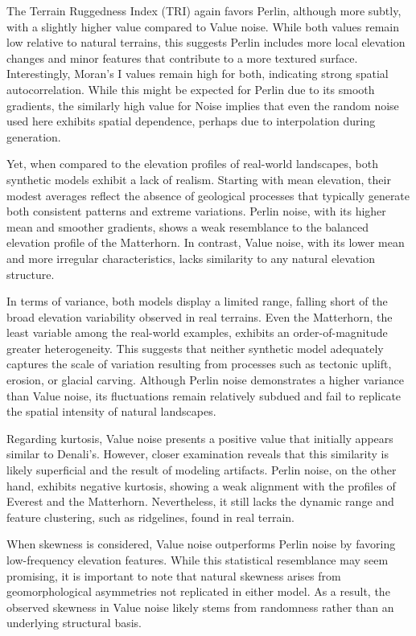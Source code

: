 The Terrain Ruggedness Index (TRI) again favors Perlin, although more subtly, with a slightly higher value compared to Value noise. While both values remain low relative to natural terrains, this 
suggests Perlin includes more local elevation changes and minor features that contribute to a more textured surface. Interestingly, Moran’s I values remain high for both, indicating strong spatial 
autocorrelation. While this might be expected for Perlin due to its smooth gradients, the similarly high value for Noise implies that even the random noise used here exhibits spatial dependence, 
perhaps due to interpolation during generation.

Yet, when compared to the elevation profiles of real-world landscapes, both synthetic models exhibit a lack of realism. Starting with mean elevation, their modest averages reflect the absence of 
geological processes that typically generate both consistent patterns and extreme variations. Perlin noise, with its higher mean and smoother gradients, shows a weak resemblance to the balanced 
elevation profile of the Matterhorn. In contrast, Value noise, with its lower mean and more irregular characteristics, lacks similarity to any natural elevation structure.

In terms of variance, both models display a limited range, falling short of the broad elevation variability observed in real terrains. Even the Matterhorn, the least variable among the real-world 
examples, exhibits an order-of-magnitude greater heterogeneity. This suggests that neither synthetic model adequately captures the scale of variation resulting from processes such as tectonic 
uplift, erosion, or glacial carving. Although Perlin noise demonstrates a higher variance than Value noise, its fluctuations remain relatively subdued and fail to replicate the spatial intensity 
of natural landscapes.

Regarding kurtosis, Value noise presents a positive value that initially appears similar to Denali's. However, closer examination reveals that this similarity is likely superficial and the result 
of modeling artifacts. Perlin noise, on the other hand, exhibits negative kurtosis, showing a weak alignment with the profiles of Everest and the Matterhorn. Nevertheless, it still lacks the dynamic 
range and feature clustering, such as ridgelines, found in real terrain.

When skewness is considered, Value noise outperforms Perlin noise by favoring low-frequency elevation features. While this statistical resemblance may seem promising, it is important to note that 
natural skewness arises from geomorphological asymmetries not replicated in either model. As a result, the observed skewness in Value noise likely stems from randomness rather than an underlying 
structural basis.

